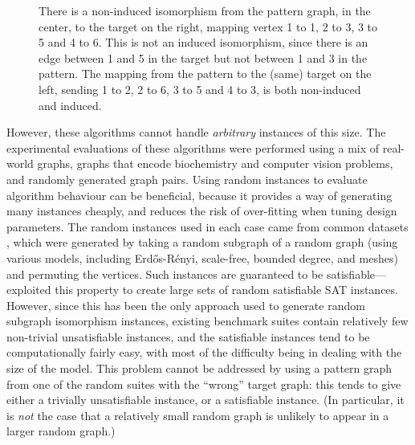 \documentclass[letterpaper]{article}
\begin{document}
\begin{figure}[b]

    \caption{There is a non-induced isomorphism from the pattern graph, in the center, to the target
    on the right, mapping vertex 1 to 1, 2 to 3, 3 to 5 and 4 to 6. This is not an induced
    isomorphism, since there is an edge between 1 and 5 in the target but not between 1 and 3 in the
    pattern. The mapping from the pattern to the (same) target on the left, sending 1 to 2, 2 to 6,
    3 to 5 and 4 to 3, is both non-induced and induced.}
    \label{figure:sip}
\end{figure}

However, these algorithms cannot handle \emph{arbitrary} instances of this size. The experimental
evaluations of these algorithms were performed using a mix of real-world graphs, graphs that encode
biochemistry and computer vision problems, and randomly generated graph pairs. Using random
instances to evaluate algorithm behaviour can be beneficial, because it provides a way of generating
many instances cheaply, and reduces the risk of over-fitting when tuning design parameters. The
random instances used in each case came from common datasets \citep{DeSanto:2003,Zampelli:2010},
which were generated by taking a random subgraph of a random graph (using various models, including
Erd\H{o}s-R\'enyi, scale-free, bounded degree, and meshes) and permuting the vertices. Such
instances are guaranteed to be satisfiable---\citet{Anton:2009} exploited this property to create
large sets of random satisfiable SAT instances.  However, since this has been the only approach used
to generate random subgraph isomorphism instances, existing benchmark suites contain relatively few
non-trivial unsatisfiable instances, and the satisfiable instances tend to be computationally fairly
easy, with most of the difficulty being in dealing with the size of the model.  This problem cannot
be addressed by using a pattern graph from one of the random suites with the ``wrong'' target graph:
this tends to give either a trivially unsatisfiable instance, or a satisfiable instance. (In
particular, it is \emph{not} the case that a relatively small random graph is unlikely to appear in
a larger random graph.)
\end{document}
